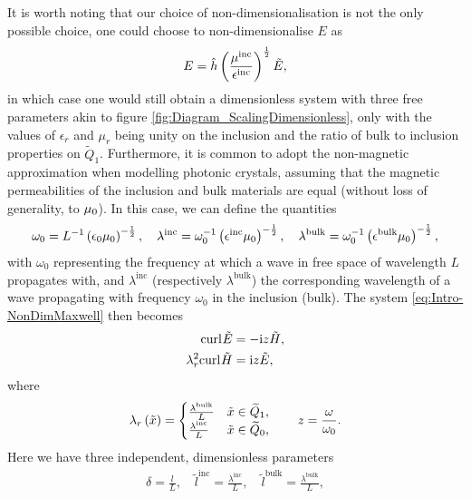 It is worth noting that our choice of non-dimensionalisation is not the only possible choice, one could choose to non-dimensionalise $E$ as
\begin{align*}
	E = \hat{h}\left( \frac{\mu^{\mathrm{inc}}}{\epsilon^{\mathrm{inc}}} \right)^{\frac{1}{2}}\tilde{E},
\end{align*}
in which case one would still obtain a dimensionless system with three free parameters akin to figure \ref{fig:Diagram_ScalingDimensionless}, only with the values of $\epsilon_r$ and $\mu_r$ being unity on the inclusion and the ratio of bulk to inclusion properties on $\tilde{Q}_1$.
Furthermore, it is common to adopt the non-magnetic approximation when modelling photonic crystals, assuming that the magnetic permeabilities of the inclusion and bulk materials are equal (without loss of generality, to $\mu_0$).
In this case, we can define the quantities
\begin{align*}
	\omega_0 = L^{-1}\left( \epsilon_0\mu_0 \right)^{-\frac{1}{2}}, \quad
	\lambda^{\mathrm{inc}} = \omega_0^{-1}\left( \epsilon^{\mathrm{inc}}\mu_0 \right)^{-\frac{1}{2}}, \quad
	\lambda^{\mathrm{bulk}} = \omega_0^{-1}\left( \epsilon^{\mathrm{bulk}}\mu_0 \right)^{-\frac{1}{2}},
\end{align*}
with $\omega_0$ representing the frequency at which a wave in free space of wavelength $L$ propagates with, and $\lambda^{\mathrm{inc}}$ (respectively $\lambda^{\mathrm{bulk}}$) the corresponding wavelength of a wave propagating with frequency $\omega_0$ in the inclusion (bulk).
The system \eqref{eq:Intro-NonDimMaxwell} then becomes
\begin{subequations} \label{eq:Intro-NonDimMaxwellLengths}
	\begin{align}
		\mathrm{curl}_{}\tilde{E} &= -\mathrm{i} z\tilde{H}, \\
		\lambda_{r}^2\mathrm{curl}_{}\tilde{H} &= \mathrm{i} z\tilde{E},
	\end{align}
\end{subequations}
where
\begin{align*}
	\lambda_r\left( \tilde{x} \right) = 
	\begin{cases} 
		\frac{\lambda^{\mathrm{bulk}}}{L} & \tilde{x}\in\widetilde{Q}_1, \\ 
		\frac{\lambda^{\mathrm{inc}}}{L} & \tilde{x}\in\widetilde{Q}_0,
	\end{cases}
	\qquad
	z = \frac{\omega}{\omega_0}.
\end{align*}
Here we have three independent, dimensionless parameters
\begin{align} \label{eq:Intro-NonDimLengthScales}
	\delta = \frac{l}{L}, \quad
	\tilde{l}^{\mathrm{inc}} = \frac{\lambda^{\mathrm{inc}}}{L}, \quad
	\tilde{l}^{\mathrm{bulk}} = \frac{\lambda^{\mathrm{bulk}}}{L},
\end{align}
